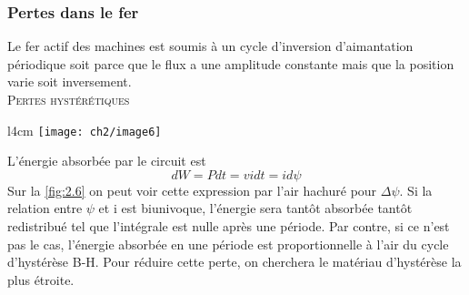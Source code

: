 	\subsubsection{Pertes dans le fer}
	Le fer actif des machines est soumis à un cycle d'inversion d'aimantation périodique soit parce que le flux a une amplitude constante mais que la position varie soit inversement. \\
	
	\textsc{Pertes hystérétiques}\\
	\begin{wrapfigure}[8]{l}{4cm}
	\vspace{-5mm}
	\texttt{[image: ch2/image6]} 
	\label{fig:2.6}
	\end{wrapfigure}
	L'énergie absorbée par le circuit est
	\begin{equation}
		dW = Pdt = vidt = id\psi
	\end{equation}
	Sur la \autoref{fig:2.6} on peut voir cette expression par l'air hachuré pour $\Delta \psi$. Si la relation entre $\psi$ et i est biunivoque, l'énergie sera tantôt absorbée tantôt redistribué tel que l'intégrale est nulle après une période. Par contre, si ce n'est pas le cas, l'énergie absorbée en une période est proportionnelle à l'air du cycle d'hystérèse B-H. Pour réduire cette perte, on cherchera le matériau d'hystérèse la plus étroite. \\
	
